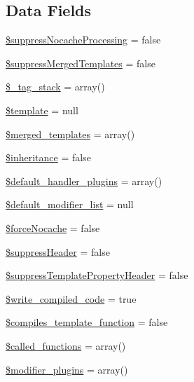 \subsection*{Data Fields}
\begin{DoxyCompactItemize}
\item 
\hyperlink{class_smarty___internal___template_compiler_base_ab9e88f51f3985af88d5b523ac2805466}{\$suppress\+Nocache\+Processing} = false
\item 
\hyperlink{class_smarty___internal___template_compiler_base_abd6026dad53c4dc92f2ca11955a6f828}{\$suppress\+Merged\+Templates} = false
\item 
\hyperlink{class_smarty___internal___template_compiler_base_a8bc334635a0aa8e117a5e822ca71ee67}{\$\+\_\+tag\+\_\+stack} = array()
\item 
\hyperlink{class_smarty___internal___template_compiler_base_aa3e9534005fd516d941f6a5569896e01}{\$template} = null
\item 
\hyperlink{class_smarty___internal___template_compiler_base_a668b99c1dc878dfad4e0b20805a5dc6d}{\$merged\+\_\+templates} = array()
\item 
\hyperlink{class_smarty___internal___template_compiler_base_a9e2feffb0a75c8e64dc6fe858f41f671}{\$inheritance} = false
\item 
\hyperlink{class_smarty___internal___template_compiler_base_a25fc2d4db83b77134e74337012a3d470}{\$default\+\_\+handler\+\_\+plugins} = array()
\item 
\hyperlink{class_smarty___internal___template_compiler_base_aecc61c448defa8dbd8f471e2a06e759c}{\$default\+\_\+modifier\+\_\+list} = null
\item 
\hyperlink{class_smarty___internal___template_compiler_base_a7868de724a26cf0c234c9768c6cb1ca4}{\$force\+Nocache} = false
\item 
\hyperlink{class_smarty___internal___template_compiler_base_aa16c2e916d26706e370d818f37ae7412}{\$suppress\+Header} = false
\item 
\hyperlink{class_smarty___internal___template_compiler_base_ac036a6dcef2daf9f9c94d54bc5b9f29f}{\$suppress\+Template\+Property\+Header} = false
\item 
\hyperlink{class_smarty___internal___template_compiler_base_a5e7d998d12b28a7a21ba0fe0de6238d6}{\$write\+\_\+compiled\+\_\+code} = true
\item 
\hyperlink{class_smarty___internal___template_compiler_base_a62c074800ffcb529d38b6b47dc166648}{\$compiles\+\_\+template\+\_\+function} = false
\item 
\hyperlink{class_smarty___internal___template_compiler_base_af96e3a9c4ae43c99d008a3f5140d16f4}{\$called\+\_\+functions} = array()
\item 
\hyperlink{class_smarty___internal___template_compiler_base_acc270a691f094e2be485f9d42f2734ae}{\$modifier\+\_\+plugins} = array()
\end{DoxyCompactItemize}
